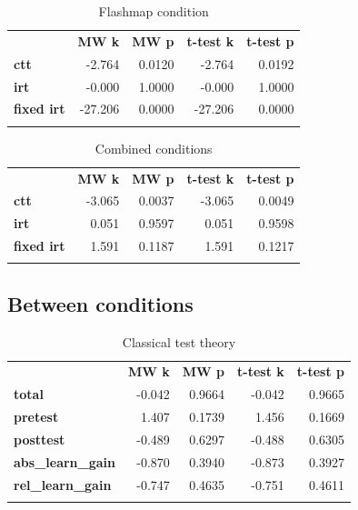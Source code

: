 \begin{longtable}[c]{@{}lrrrr@{}}
\caption{Flashmap condition}
\endfirsthead
\endhead
\toprule\addlinespace
& \textbf{MW k} & \textbf{MW p} &
\textbf{t-test k} & \textbf{t-test p}
\\\addlinespace
\midrule
\textbf{ctt} & -2.764 & 0.0120 & -2.764 & 0.0192
\\\addlinespace
\textbf{irt} & -0.000 & 1.0000 & -0.000 & 1.0000
\\\addlinespace
\textbf{fixed irt} & -27.206 & 0.0000 & -27.206 & 0.0000
\\\addlinespace
\bottomrule
    \label{tab:know_pp_fm_comp}
\end{longtable}

\begin{longtable}[c]{@{}lrrrr@{}}
\caption{Combined conditions}
\endfirsthead
\endhead
\toprule\addlinespace
& \textbf{MW k} & \textbf{MW p} &
\textbf{t-test k} & \textbf{t-test p}
\\\addlinespace
\midrule
\textbf{ctt} & -3.065 & 0.0037 & -3.065 & 0.0049
\\\addlinespace
\textbf{irt} & 0.051 & 0.9597 & 0.051 & 0.9598
\\\addlinespace
\textbf{fixed irt} & 1.591 & 0.1187 & 1.591 & 0.1217
\\\addlinespace
\bottomrule
    \label{tab:know_pp_gen_comp}
\end{longtable}

\FloatBarrier
\subsection{Between conditions}

\begin{longtable}[c]{@{}lrrrr@{}}
\caption{Classical test theory}
\endfirsthead
\endhead
\toprule\addlinespace
& \textbf{MW k} & \textbf{MW p} &
\textbf{t-test k} & \textbf{t-test p}
\\\addlinespace
\midrule
\textbf{total} & -0.042 & 0.9664 & -0.042 & 0.9665
\\\addlinespace
\textbf{pretest} & 1.407 & 0.1739 & 1.456 & 0.1669
\\\addlinespace
\textbf{posttest} & -0.489 & 0.6297 & -0.488 & 0.6305
\\\addlinespace
\textbf{abs\_learn\_gain} & -0.870 & 0.3940 & -0.873 & 0.3927
\\\addlinespace
\textbf{rel\_learn\_gain} & -0.747 & 0.4635 & -0.751 & 0.4611
\\\addlinespace
\bottomrule
    \label{tab:know_cond_ctt_comp}
\end{longtable}

